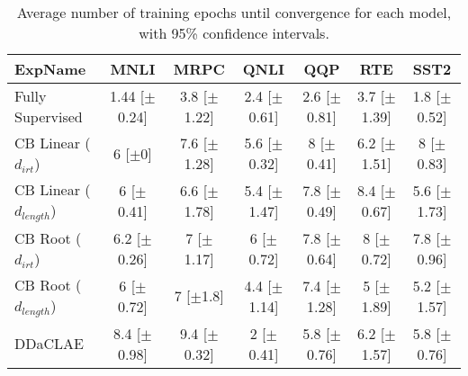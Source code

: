 \begin{table*}[ht]
\centering
\begingroup\small
\begin{tabular}{lcccccc}
  \hline
ExpName & MNLI & MRPC & QNLI & QQP & RTE & SST2 \\ 
  \hline
Fully Supervised & 1.44 [$\pm$0.24] & 3.8 [$\pm$1.22] & 2.4 [$\pm$0.61] & 2.6 [$\pm$0.81] & 3.7 [$\pm$1.39] & 1.8 [$\pm$0.52] \\ 
  CB Linear ($d_{irt}$) & 6 [$\pm$0] & 7.6 [$\pm$1.28] & 5.6 [$\pm$0.32] & 8 [$\pm$0.41] & 6.2 [$\pm$1.51] & 8 [$\pm$0.83] \\ 
  CB Linear ($d_{length}$) & 6 [$\pm$0.41] & 6.6 [$\pm$1.78] & 5.4 [$\pm$1.47] & 7.8 [$\pm$0.49] & 8.4 [$\pm$0.67] & 5.6 [$\pm$1.73] \\ 
  CB Root ($d_{irt}$) & 6.2 [$\pm$0.26] & 7 [$\pm$1.17] & 6 [$\pm$0.72] & 7.8 [$\pm$0.64] & 8 [$\pm$0.72] & 7.8 [$\pm$0.96] \\ 
  CB Root ($d_{length}$) & 6 [$\pm$0.72] & 7 [$\pm$1.8] & 4.4 [$\pm$1.14] & 7.4 [$\pm$1.28] & 5 [$\pm$1.89] & 5.2 [$\pm$1.57] \\ 
  DDaCLAE & 8.4 [$\pm$0.98] & 9.4 [$\pm$0.32] & 2 [$\pm$0.41] & 5.8 [$\pm$0.76] & 6.2 [$\pm$1.57] & 5.8 [$\pm$0.76] \\ 
   \hline
\end{tabular}
\endgroup
\caption{Average number of training epochs until convergence for each model, with 95\% confidence intervals.} 
\label{tab:epoch_bert-True}
\end{table*}
